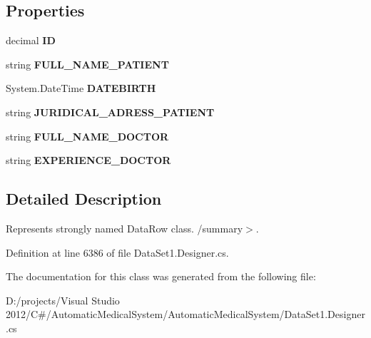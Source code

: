 \subsection*{Properties}
\begin{CompactItemize}
\item 
decimal \textbf{ID}\hspace{0.3cm}{\tt  [get, set]}\label{class_automatic_medical_system_1_1_data_set1_1_1_v_f_a_m_i_l_y_d_o_c_t_o_r_row_b27cb75833e5a2f99ade353c41db44bc}

\item 
string \textbf{FULL\_\-NAME\_\-PATIENT}\hspace{0.3cm}{\tt  [get, set]}\label{class_automatic_medical_system_1_1_data_set1_1_1_v_f_a_m_i_l_y_d_o_c_t_o_r_row_085e66913434e9c2847cc63b0a652958}

\item 
System.DateTime \textbf{DATEBIRTH}\hspace{0.3cm}{\tt  [get, set]}\label{class_automatic_medical_system_1_1_data_set1_1_1_v_f_a_m_i_l_y_d_o_c_t_o_r_row_5c08c276150495f1b7871377a49f3f7b}

\item 
string \textbf{JURIDICAL\_\-ADRESS\_\-PATIENT}\hspace{0.3cm}{\tt  [get, set]}\label{class_automatic_medical_system_1_1_data_set1_1_1_v_f_a_m_i_l_y_d_o_c_t_o_r_row_c60e7912606c43582f8262c0dbc83771}

\item 
string \textbf{FULL\_\-NAME\_\-DOCTOR}\hspace{0.3cm}{\tt  [get, set]}\label{class_automatic_medical_system_1_1_data_set1_1_1_v_f_a_m_i_l_y_d_o_c_t_o_r_row_377b5e314864fef5addee8e8eb49664f}

\item 
string \textbf{EXPERIENCE\_\-DOCTOR}\hspace{0.3cm}{\tt  [get, set]}\label{class_automatic_medical_system_1_1_data_set1_1_1_v_f_a_m_i_l_y_d_o_c_t_o_r_row_b74d1b1b6a0e21eac1beaa2e4710a776}

\end{CompactItemize}


\subsection{Detailed Description}
Represents strongly named DataRow class. /summary$>$. 

Definition at line 6386 of file DataSet1.Designer.cs.

The documentation for this class was generated from the following file:\begin{CompactItemize}
\item 
D:/projects/Visual Studio 2012/C\#/AutomaticMedicalSystem/AutomaticMedicalSystem/DataSet1.Designer.cs\end{CompactItemize}

